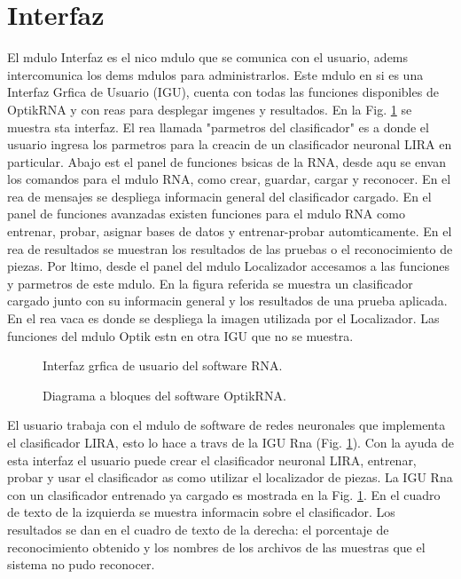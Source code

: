 \section{Interfaz}
El mdulo Interfaz es el nico mdulo que se comunica con el usuario,
adems intercomunica los dems mdulos para administrarlos. Este
mdulo en si es una Interfaz Grfica de Usuario (IGU), cuenta con
todas las funciones disponibles de OptikRNA y con reas para desplegar
imgenes y resultados. En la Fig. \ref{redneuartpantallapruebaeinfo}
se muestra sta interfaz. El rea llamada "parmetros del clasificador" es a donde el
usuario ingresa los parmetros para la creacin de un clasificador
neuronal LIRA en particular. Abajo est el panel de funciones bsicas
de la RNA, desde aqu se envan los comandos para el mdulo RNA, como
crear, guardar, cargar y reconocer. En el rea de mensajes se
despliega informacin general del clasificador cargado. En el panel de
funciones avanzadas existen funciones para el mdulo RNA como
entrenar, probar, asignar bases de datos y entrenar-probar
automticamente. En el rea de resultados se muestran los resultados
de las pruebas o el reconocimiento de piezas. Por ltimo, desde el
panel del mdulo Localizador accesamos a las funciones y parmetros de
este mdulo. En la figura referida se muestra un clasificador cargado
junto con su informacin general y los resultados de una prueba
aplicada. En el rea vaca es donde se despliega la imagen utilizada
por el Localizador. Las funciones del mdulo Optik estn en otra IGU que no se muestra.

\begin{figure}[h]
\caption{Interfaz grfica de usuario del software RNA.}
\label{redneuartpantallapruebaeinfo}
\end{figure}


\begin{figure}[h]
\begin{center}
\caption{Diagrama a bloques del software OptikRNA.}\label{blockdiagramredneuartoptik}
\end{center}
\end{figure}

El usuario trabaja con el mdulo de software de redes neuronales que implementa el clasificador LIRA, esto lo hace a travs de la IGU Rna (Fig. \ref{redneuartpantallapruebaeinfo}). Con la ayuda de esta interfaz el usuario puede crear el clasificador neuronal LIRA, entrenar, probar y usar el clasificador as como utilizar el localizador de piezas. La IGU Rna con un clasificador entrenado ya cargado es mostrada en la Fig. \ref{redneuartpantallapruebaeinfo}. En el cuadro de texto de la izquierda se muestra informacin sobre el clasificador. Los resultados se dan en el cuadro de texto de la derecha: el porcentaje de reconocimiento obtenido y los nombres de los archivos de las muestras que el sistema no pudo reconocer.

